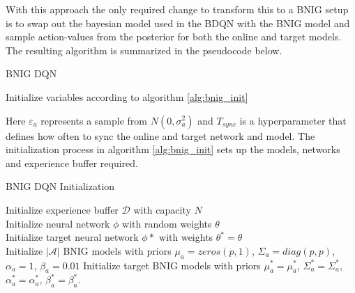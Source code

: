 With this approach the only required change to transform this to a BNIG setup is to swap out the bayesian model used in the BDQN with the BNIG model and sample action-values from the posterior for both the online and target models. The resulting algorithm is summarized in the pseudocode below.

\begin{algorithm}[H]
    \caption{BNIG DQN}
    Initialize variables according to algorithm \ref{alg:bnig_init}\\
\end{algorithm}

Here $\varepsilon_a$ represents a sample from $N(0,\sigma^2_a)$ and $T_{sync}$ is a hyperparameter that defines how often to sync the online and target network and model. The initialization process in algorithm \ref{alg:bnig_init} sets up the models, networks and experience buffer required.

\begin{algorithm}[H]
    \caption{BNIG DQN Initialization}
    \label{alg:bnig_init}
    Initialize experience buffer $\mathcal{D}$ with capacity $N$\\
    Initialize neural network $\phi$ with random weights $\theta$\\
    Initialize target neural network $\phi*$ with weights $\theta^*=\theta$\\
    Initialize $|\mathcal{A}|$ BNIG models with priors $\mu_a = zeros(p,1)$, $\Sigma_a = diag(p,p)$, $\alpha_a = 1$, $\beta_a = 0.01$
    Initialize target BNIG models with priors $\mu^*_a = \mu^*_a$, $\Sigma^*_a = \Sigma^*_a$, $\alpha^*_a = \alpha^*_a$, $\beta^*_a = \beta^*_a$.
\end{algorithm}

